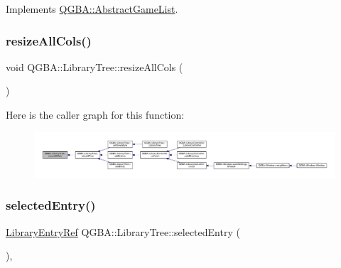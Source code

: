Implements \mbox{\hyperlink{class_q_g_b_a_1_1_abstract_game_list_ab0745ae397ca851cf29377511b10ee6f}{Q\+G\+B\+A\+::\+Abstract\+Game\+List}}.

\mbox{\label{class_q_g_b_a_1_1_library_tree_a39b86cb11db4ee69205791df77606597}} 
\subsubsection{\texorpdfstring{resize\+All\+Cols()}{resizeAllCols()}}
{\footnotesize\ttfamily void Q\+G\+B\+A\+::\+Library\+Tree\+::resize\+All\+Cols (\begin{DoxyParamCaption}{ }\end{DoxyParamCaption})\hspace{0.3cm}{\ttfamily [private]}}

Here is the caller graph for this function\+:
\nopagebreak
\begin{figure}[H]
\begin{center}
\leavevmode
\includegraphics[width=350pt]{class_q_g_b_a_1_1_library_tree_a39b86cb11db4ee69205791df77606597_icgraph}
\end{center}
\end{figure}
\mbox{\label{class_q_g_b_a_1_1_library_tree_a4066e38c1708df9e31f451c78c3905bc}} 
\subsubsection{\texorpdfstring{selected\+Entry()}{selectedEntry()}}
{\footnotesize\ttfamily \mbox{\hyperlink{namespace_q_g_b_a_a201fa9f2cb8f778666a134ba81909358}{Library\+Entry\+Ref}} Q\+G\+B\+A\+::\+Library\+Tree\+::selected\+Entry (\begin{DoxyParamCaption}{ }\end{DoxyParamCaption})\hspace{0.3cm}{\ttfamily [override]}, {\ttfamily [virtual]}}



